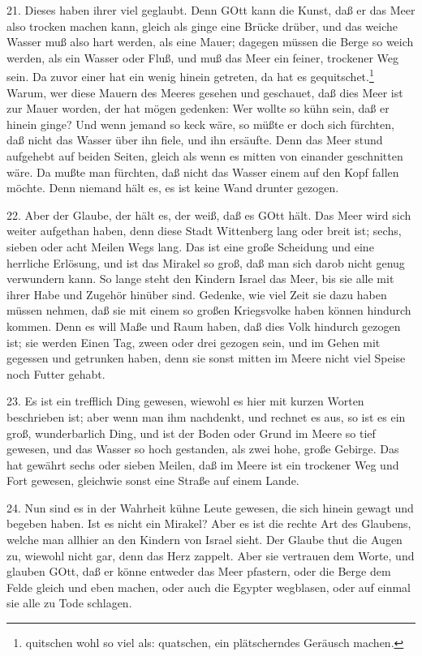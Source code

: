 21. Dieses haben ihrer viel geglaubt. Denn GOtt kann die Kunst, daß er das Meer also trocken machen kann, gleich als ginge eine Brücke drüber, und das weiche Wasser muß also hart werden, als eine Mauer; dagegen müssen die Berge so weich werden, als ein Wasser oder Fluß, und muß das Meer ein feiner, trockener Weg sein. Da zuvor einer hat ein wenig hinein getreten, da hat es gequitschet.\footnote{quitschen wohl so viel als: quatschen, ein plätscherndes Geräusch machen.} Warum, wer diese Mauern des Meeres gesehen und geschauet, daß dies Meer ist zur Mauer worden, der hat mögen gedenken: Wer wollte so kühn sein, daß er hinein ginge? Und wenn jemand so keck wäre, so müßte er doch sich fürchten, daß nicht das Wasser über ihn fiele, und ihn ersäufte. Denn das Meer stund aufgehebt auf beiden Seiten, gleich als wenn es mitten von einander geschnitten wäre. Da mußte man fürchten, daß
nicht das Wasser einem auf den Kopf fallen möchte. Denn niemand hält es, es ist keine Wand drunter gezogen.

22. Aber der Glaube, der hält es, der weiß, daß es GOtt hält. Das Meer wird sich weiter aufgethan haben, denn diese Stadt Wittenberg lang oder breit ist; sechs, sieben oder acht Meilen Wegs lang. Das ist eine große Scheidung und eine herrliche Erlösung, und ist das Mirakel so groß, daß man sich darob nicht genug verwundern kann. So lange steht den Kindern Israel das Meer, bis sie alle mit ihrer Habe und Zugehör hinüber sind. Gedenke, wie viel Zeit sie dazu haben müssen nehmen, daß sie mit einem so großen Kriegsvolke haben können hindurch kommen. Denn es will Maße und Raum haben, daß dies Volk hindurch gezogen ist; sie werden Einen Tag, zween oder drei gezogen sein, und im Gehen mit gegessen und getrunken haben, denn sie sonst mitten im Meere nicht viel Speise noch Futter gehabt.

23. Es ist ein trefflich Ding gewesen, wiewohl es hier mit kurzen Worten beschrieben ist; aber wenn man ihm nachdenkt, und rechnet es aus, so ist es ein groß, wunderbarlich Ding, und ist der Boden oder Grund im Meere so tief gewesen, und das Wasser so hoch gestanden, als zwei hohe, große Gebirge. Das hat gewährt sechs oder sieben Meilen, daß im Meere ist ein trockener Weg und Fort gewesen, gleichwie sonst eine Straße auf einem Lande.

24. Nun sind es in der Wahrheit kühne Leute gewesen, die sich hinein gewagt und begeben haben. Ist es nicht ein Mirakel? Aber es ist die rechte Art des Glaubens, welche man allhier an den Kindern von Israel sieht. Der Glaube thut die Augen zu, wiewohl nicht gar, denn das Herz zappelt. Aber sie vertrauen dem Worte, und glauben GOtt, daß er könne entweder das Meer pfastern, oder die Berge dem Felde gleich und eben machen, oder auch die Egypter wegblasen, oder auf einmal sie alle zu Tode schlagen.

